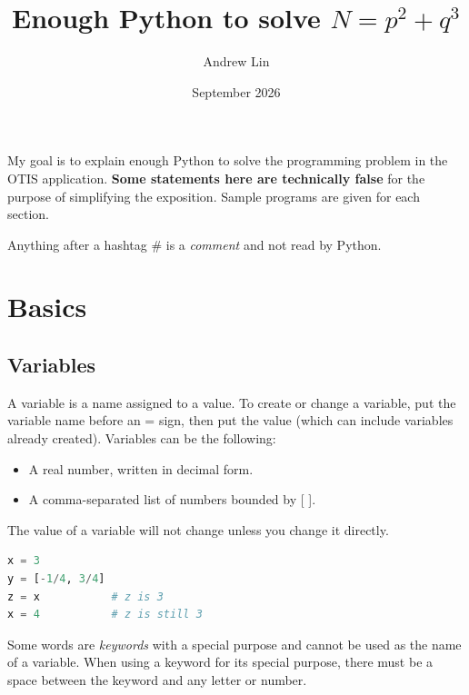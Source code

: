 \documentclass[11pt]{scrartcl}
\begin{document}
\title{Enough Python to solve $N = p^2 + q^3$}
\author{Andrew Lin}
\date{September 2026}
\maketitle

My goal is to explain enough Python to solve the programming problem in the OTIS application.
\textbf{Some statements here are technically false}
for the purpose of simplifying the exposition.
Sample programs are given for each section.

Anything after a hashtag \# is a \emph{comment} and not read by Python.

\section{Basics}
\label{sec:basic}
\subsection{Variables}
A variable is a name assigned to a value.
To create or change a variable, put the variable name before an = sign,
then put the value (which can include variables already created). Variables can be the following:
\begin{itemize}
    \item A real number, written in decimal form.
    \item A comma-separated list of numbers bounded by [ ].
\end{itemize}
The value of a variable will not change unless you change it directly.
\begin{lstlisting}[language=Python]
x = 3
y = [-1/4, 3/4]
z = x           # z is 3
x = 4           # z is still 3
\end{lstlisting}
Some words are \emph{keywords} with a special purpose and cannot be used as the name of a variable.
When using a keyword for its special purpose,
there must be a space between the keyword and any letter or number.
\end{document}
